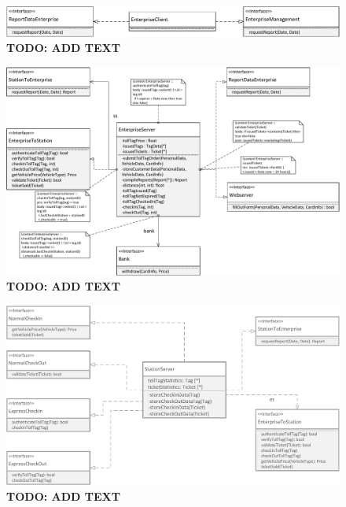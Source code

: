 \begin{figure}
\centerline{\includegraphics[width=\textwidth]{img/class_diagrams/class_diagram_enterprise_client}}
\caption{\textbf{TODO: ADD TEXT}}
\label{fig:cld_ec}
\end{figure}

\begin{figure}
\centerline{\includegraphics[width=\textwidth]{img/class_diagrams/class_diagram_enterprise_server}}
\caption{\textbf{TODO: ADD TEXT}}
\label{fig:cld_es}
\end{figure}

\begin{figure}
\centerline{\includegraphics[width=\textwidth]{img/class_diagrams/class_diagram_station_server}}
\caption{\textbf{TODO: ADD TEXT}}
\label{fig:cld_ss}
\end{figure}

